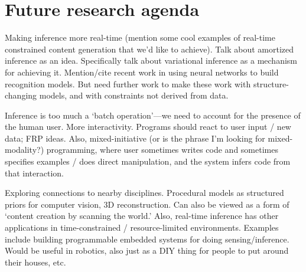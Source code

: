 \documentclass[
11pt, %
a4paper, %
oneside, %
headinclude,footinclude, %
BCOR5mm, %
]{scrartcl}
\begin{document}
\section*{Future research agenda}

Making inference more real-time (mention some cool examples of real-time constrained content generation that we'd like to achieve). Talk about amortized inference as an idea. Specifically talk about variational inference as a mechanism for achieving it. Mention/cite recent work in using neural networks to build recognition models. But need further work to make these work with structure-changing models, and with constraints not derived from data.

Inference is too much a `batch operation'---we need to account for the presence of the human user. More interactivity. Programs should react to user input / new data; FRP ideas. Also, mixed-initiative (or is the phrase I'm looking for mixed-modality?) programming, where user sometimes writes code and sometimes specifies examples / does direct manipulation, and the system infers code from that interaction.

Exploring connections to nearby disciplines. Procedural models as structured priors for computer vision, 3D reconstruction. Can also be viewed as a form of `content creation by scanning the world.' Also, real-time inference has other applications in time-constrained / resource-limited environments. Examples include building programmable embedded systems for doing sensing/inference. Would be useful in robotics, also just as a DIY thing for people to put around their houses, etc.




\end{document}

